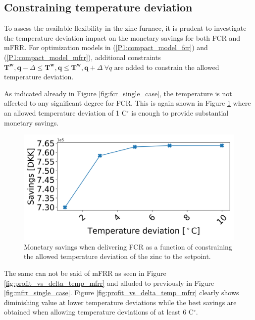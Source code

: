 \documentclass[sigconf]{acmart}
\begin{document}
\subsection{Constraining temperature deviation}

To assess the available flexibility in the zinc furnace, it is prudent to investigate the temperature deviation impact on the monetary savings for both FCR and mFRR. For optimization models in (\ref{P1:compact_model_fcr}) and (\ref{P1:compact_model_mfrr}), additional constraints $\bm{T^{w},q} - \Delta \leq \bm{T^{w},q} \leq \bm{T^{w},q} + \Delta \ \forall{q}$ are added to constrain the allowed temperature deviation.

As indicated already in Figure \ref{fig:fcr_single_case}, the temperature is not affected to any significant degree for FCR. This is again shown in Figure \ref{fig:profit_vs_delta_temp_fcr} where an allowed temperature deviation of 1 C$^{\circ}$ is enough to provide substantial monetary savings.

\begin{figure}[t]
    \centering
    \includegraphics[width=\columnwidth]{figures/profit_vs_delta_temp_fcr.png}
    \caption{Monetary savings when delivering FCR as a function of constraining the allowed temperature deviation of the zinc to the setpoint.}
    \label{fig:profit_vs_delta_temp_fcr}
\end{figure}

The same can not be said of mFRR as seen in Figure \ref{fig:profit_vs_delta_temp_mfrr} and alluded to previously in Figure \ref{fig:mfrr_single_case}. Figure \ref{fig:profit_vs_delta_temp_mfrr} clearly shows diminishing value at lower temperature deviations while the best savings are obtained when allowing temperature deviations of at least 6 C$^{\circ}$.
\end{document}
